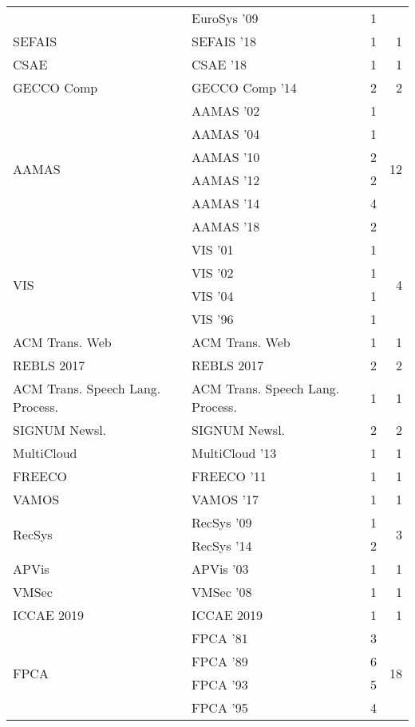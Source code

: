\begin{table*}[t]
\begin{tabular}{llrr}
& EuroSys '09 & 1 &\\
\multirow{1}{*}{SEFAIS } & SEFAIS '18 & 1 & \multirow{1}{*}{1}\\
\multirow{1}{*}{CSAE } & CSAE '18 & 1 & \multirow{1}{*}{1}\\
\multirow{1}{*}{GECCO Comp } & GECCO Comp '14 & 2 & \multirow{1}{*}{2}\\
\multirow{6}{*}{AAMAS } & AAMAS '02 & 1 & \multirow{6}{*}{12}\\
& AAMAS '04 & 1 &\\
& AAMAS '10 & 2 &\\
& AAMAS '12 & 2 &\\
& AAMAS '14 & 4 &\\
& AAMAS '18 & 2 &\\
\multirow{4}{*}{VIS } & VIS '01 & 1 & \multirow{4}{*}{4}\\
& VIS '02 & 1 &\\
& VIS '04 & 1 &\\
& VIS '96 & 1 &\\
\multirow{1}{*}{ACM Trans. Web} & ACM Trans. Web & 1 & \multirow{1}{*}{1}\\
\multirow{1}{*}{REBLS 2017} & REBLS 2017 & 2 & \multirow{1}{*}{2}\\
\multirow{1}{*}{ACM Trans. Speech Lang. Process.} & ACM Trans. Speech Lang. Process. & 1 & \multirow{1}{*}{1}\\
\multirow{1}{*}{SIGNUM Newsl.} & SIGNUM Newsl. & 2 & \multirow{1}{*}{2}\\
\multirow{1}{*}{MultiCloud } & MultiCloud '13 & 1 & \multirow{1}{*}{1}\\
\multirow{1}{*}{FREECO } & FREECO '11 & 1 & \multirow{1}{*}{1}\\
\multirow{1}{*}{VAMOS } & VAMOS '17 & 1 & \multirow{1}{*}{1}\\
\multirow{2}{*}{RecSys } & RecSys '09 & 1 & \multirow{2}{*}{3}\\
& RecSys '14 & 2 &\\
\multirow{1}{*}{APVis } & APVis '03 & 1 & \multirow{1}{*}{1}\\
\multirow{1}{*}{VMSec } & VMSec '08 & 1 & \multirow{1}{*}{1}\\
\multirow{1}{*}{ICCAE 2019} & ICCAE 2019 & 1 & \multirow{1}{*}{1}\\
\multirow{4}{*}{FPCA } & FPCA '81 & 3 & \multirow{4}{*}{18}\\
& FPCA '89 & 6 &\\
& FPCA '93 & 5 &\\
& FPCA '95 & 4 &\\

\end{tabular}
\end{table*}
